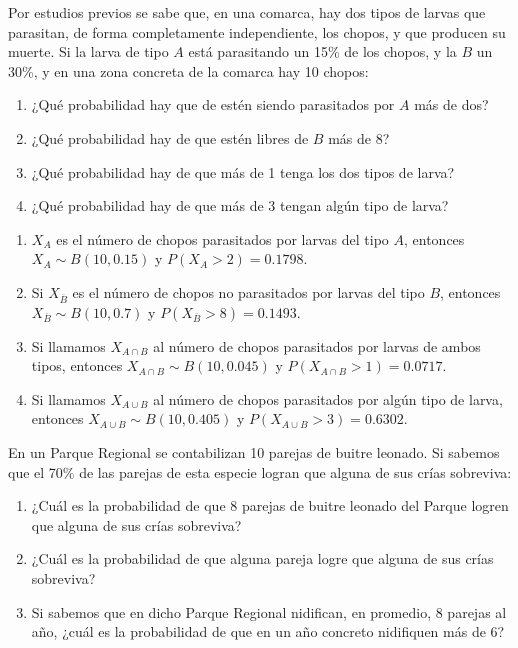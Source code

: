 {Por estudios previos se sabe que, en una comarca, hay dos tipos de larvas que parasitan, de forma completamente
independiente, los chopos, y que producen su muerte.
Si la larva de tipo $A$ está parasitando un 15\% de los chopos, y la $B$ un 30\%, y en una zona concreta de la comarca
hay 10 chopos:
\begin{enumerate}
\item ¿Qué probabilidad hay que de estén siendo parasitados por $A$ más de dos?
\item ¿Qué probabilidad hay de que estén libres de $B$ más de 8?
\item ¿Qué probabilidad hay de que más de 1 tenga los dos tipos de larva?
\item ¿Qué probabilidad hay de que más de 3 tengan algún tipo de larva?
\end{enumerate}
}
{
\begin{enumerate}
\item $X_A$ es el número de chopos parasitados por larvas del tipo $A$, entonces $X_A\sim B(10,0.15)$ y
$P(X_A>2)=0.1798$.
\item Si $X_{\overline{B}}$ es el número de chopos no parasitados por larvas del tipo $B$, entonces
$X_{\overline{B}}\sim B(10,0.7)$ y $P(X_{\overline{B}}>8)=0.1493$.
\item Si llamamos $X_{A\cap B}$ al número de chopos parasitados por larvas de ambos tipos, entonces $X_{A\cap B}\sim
B(10,0.045)$ y $P(X_{A\cap B}>1)=0.0717$.
\item Si llamamos $X_{A\cup B}$ al número de chopos parasitados por algún tipo de larva, entonces $X_{A\cup B}\sim
B(10,0.405)$ y $P(X_{A\cup B}>3)=0.6302$.
\end{enumerate}
}
{}


{En un Parque Regional se contabilizan 10 parejas de buitre leonado. Si sabemos que el 70\% de las parejas de esta especie logran que alguna de sus crías sobreviva:
\begin{enumerate}
\item ¿Cuál es la probabilidad de que 8 parejas de buitre leonado del Parque logren que alguna de sus crías sobreviva?
\item ¿Cuál es la probabilidad de que alguna pareja logre que alguna de sus crías sobreviva?
\item Si sabemos que en dicho Parque Regional nidifican, en promedio, 8 parejas al año, ¿cuál es la probabilidad de que en un año concreto nidifiquen más de 6?
\end{enumerate}
}
{}
{}


